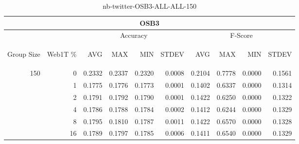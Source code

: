 \begin{center}
\begin{table}[htbp]
\begin{center}
\begin{tabular}{ | r | r | r | r | r | r | r | r | r | r |}
\hline
\multicolumn{10}{|c|}{OSB3}\\
\hline
 & & \multicolumn{4}{|c|}{Accuracy} & \multicolumn{4}{|c|}{F-Score}\\ \cline{3-10}
\begin{sideways}Group Size\end{sideways} & \begin{sideways}Web1T \%\end{sideways} & \begin{sideways}AVG\end{sideways} & \begin{sideways}MAX\end{sideways} & \begin{sideways}MIN\end{sideways} & \begin{sideways}STDEV\end{sideways} & \begin{sideways}AVG\end{sideways} & \begin{sideways}MAX\end{sideways} & \begin{sideways}MIN\end{sideways} & \begin{sideways}STDEV\end{sideways}\\
\hline
\multirow{5}{*}{150}
 & 0 & 0.2332 & 0.2337 & 0.2320 & 0.0008 & 0.2104 & 0.7778 & 0.0000 & 0.1561\\ \cline{2-10}
 & 1 & 0.1775 & 0.1776 & 0.1773 & 0.0001 & 0.1402 & 0.6337 & 0.0000 & 0.1314\\ \cline{2-10}
 & 2 & 0.1791 & 0.1792 & 0.1790 & 0.0001 & 0.1422 & 0.6250 & 0.0000 & 0.1322\\ \cline{2-10}
 & 4 & 0.1786 & 0.1788 & 0.1784 & 0.0002 & 0.1412 & 0.6244 & 0.0000 & 0.1329\\ \cline{2-10}
 & 8 & 0.1795 & 0.1810 & 0.1787 & 0.0011 & 0.1422 & 0.6570 & 0.0000 & 0.1328\\ \cline{2-10}
 & 16 & 0.1789 & 0.1797 & 0.1785 & 0.0006 & 0.1411 & 0.6540 & 0.0000 & 0.1329\\ \cline{2-10}
\hline
\end{tabular}
\caption{nb-twitter-OSB3-ALL-ALL-150}
\label{table:nb-twitter-OSB3-ALL-ALL-150}
\end{center}
\end{table}
\end{center}

